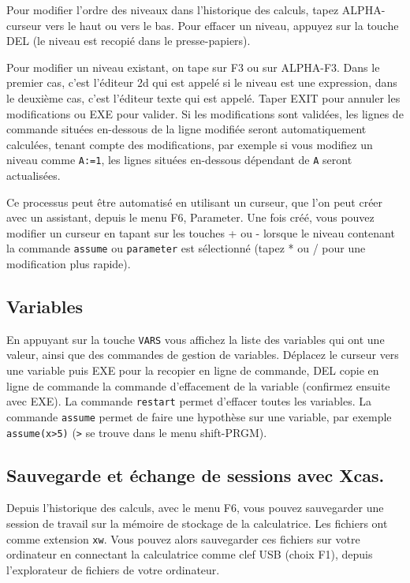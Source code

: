 \documentclass{article}
\begin{document}
\begin{giacjshere}
Pour modifier l'ordre des niveaux dans l'historique des calculs,
tapez ALPHA-curseur vers le haut ou vers le bas.
Pour effacer un niveau, appuyez sur la touche DEL (le niveau
est recopi\'e dans le presse-papiers).

Pour
modifier un niveau existant, on tape sur F3 ou sur ALPHA-F3. Dans le
premier cas, c'est l'\'editeur 2d qui est appel\'e si le niveau
est une expression, dans le
deuxi\`eme cas, c'est l'\'editeur texte qui est appel\'e.
Taper EXIT pour annuler les modifications ou EXE pour valider.
Si les modifications sont valid\'ees, les lignes de commande situ\'ees
en-dessous de la ligne modifi\'ee seront automatiquement calcul\'ees,
tenant compte des modifications, par exemple si vous modifiez un niveau
comme \verb|A:=1|, les lignes situ\'ees en-dessous d\'ependant de \verb|A|
seront actualis\'ees.

Ce processus peut \^etre automatis\'e en utilisant un curseur,
que l'on peut cr\'eer avec un assistant, depuis le menu F6,
Parameter. Une fois cr\'e\'e, vous pouvez modifier un curseur
en tapant sur les touches + ou - lorsque le niveau contenant
la commande \verb|assume| ou \verb|parameter| est s\'electionn\'e
(tapez * ou / pour une modification plus rapide).

\subsection{Variables}
En appuyant sur la touche \verb|VARS| vous affichez la liste
des variables qui ont une valeur, ainsi que des commandes de gestion
de variables. D\'eplacez le curseur vers une variable puis EXE pour
la recopier en ligne de commande, DEL copie en ligne de commande
la commande d'effacement de la variable (confirmez ensuite avec EXE).
La commande \verb|restart| permet d'effacer toutes les variables.
La commande \verb|assume| permet de faire une hypoth\`ese sur
une variable, par exemple \verb|assume(x>5)| (\verb|>| se trouve
dans le menu shift-PRGM).

\subsection{Sauvegarde et \'echange de sessions avec Xcas.}
Depuis l'historique des calculs, avec le menu F6, vous pouvez sauvegarder
une session de travail sur la m\'emoire de stockage de la
calculatrice. Les fichiers ont comme extension \verb|xw|.
Vous pouvez alors sauvegarder ces fichiers sur votre ordinateur en
connectant la calculatrice comme clef USB (choix F1), depuis
l'explorateur de fichiers de votre ordinateur.


\end{giacjshere}
\end{document}
